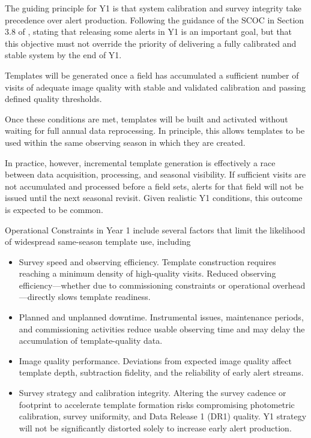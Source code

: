 The guiding principle for Y1 is that system calibration and survey integrity take precedence over alert production.
Following the guidance of the SCOC in Section 3.8 of , stating that releasing some alerts in Y1 is an important goal, but that this objective must not override the priority of delivering a fully calibrated and stable system by the end of Y1.

Templates will be generated once a field has accumulated a sufficient number of visits of adequate image quality with stable and validated calibration and passing defined quality thresholds.

Once these conditions are met, templates will be built and activated without waiting for full annual data reprocessing.
In principle, this allows templates to be used within the same observing season in which they are created.

In practice, however, incremental template generation is effectively a race between data acquisition, processing, and seasonal visibility.
If sufficient visits are not accumulated and processed before a field sets, alerts for that field will not be issued until the next seasonal revisit.
Given realistic Y1 conditions, this outcome is expected to be common.

Operational Constraints in Year 1 include several factors  that limit the likelihood of widespread same-season template use, including

\begin{itemize}
\item Survey speed and observing efficiency.
Template construction requires reaching a minimum density of high-quality visits.
Reduced observing efficiency—whether due to commissioning constraints or operational overhead—directly slows template readiness.

\item Planned and unplanned downtime.
Instrumental issues, maintenance periods, and commissioning activities reduce usable observing time and may delay the accumulation of template-quality data.

\item Image quality performance.
Deviations from expected image quality affect template depth, subtraction fidelity, and the reliability of early alert streams.

\item Survey strategy and calibration integrity.
Altering the survey cadence or footprint to accelerate template formation risks compromising photometric calibration, survey uniformity, and Data Release 1 (DR1) quality.
Y1 strategy will not be significantly distorted solely to increase early alert production.
\end{itemize}

